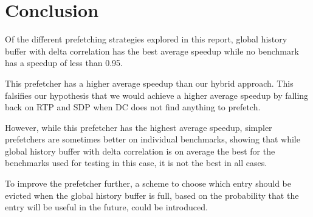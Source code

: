 \section{Conclusion}
\label{sec:conclusion}

Of the different prefetching strategies explored in this report,
global history buffer with delta correlation has the best average
speedup while no benchmark has a speedup of less than 0.95.

This prefetcher has a higher average speedup than our hybrid
approach. This falsifies our hypothesis that we would achieve
a higher average speedup by falling back on RTP and SDP when
DC does not find anything to prefetch.

However, while this prefetcher has the highest average
speedup, simpler prefetchers are sometimes better on
individual benchmarks, showing that while global history buffer
with delta correlation is on average the best for the benchmarks
used for testing in this case, it is not the best in all cases.

To improve the prefetcher further, a scheme to choose which
entry should be evicted when the global history buffer is full,
based on the probability that the entry will be useful in the
future, could be introduced.

